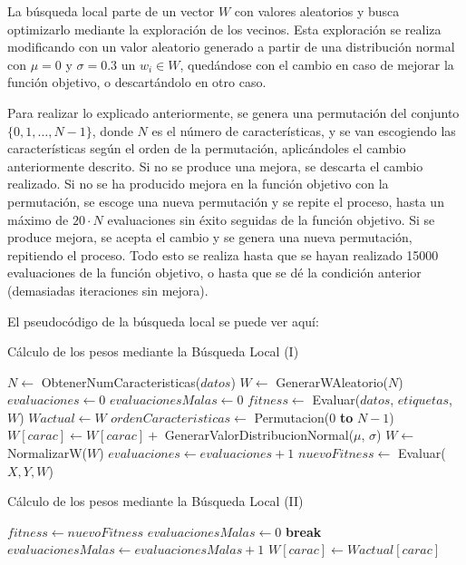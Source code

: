 \documentclass[11pt,a4paper]{article}
\begin{document}
La búsqueda local parte de un vector $W$ con valores aleatorios y busca optimizarlo mediante la exploración de los vecinos.
Esta exploración se realiza modificando con un valor aleatorio generado a partir de una distribución normal con $\mu = 0$ y 
$\sigma = 0.3$ un $w_i \in W$, quedándose con el cambio en caso de mejorar la función objetivo, o descartándolo en otro caso.

Para realizar lo explicado anteriormente, se genera una permutación del conjunto $\lbrace 0, 1, \dots , N-1 \rbrace$, donde $N$
es el número de características, y se van escogiendo las características según el orden de la permutación, aplicándoles
el cambio anteriormente descrito. Si no se produce una mejora, se descarta el cambio realizado. Si no se ha producido mejora
en la función objetivo con la permutación, se escoge una nueva permutación y se repite el proceso, hasta un máximo de $20
\cdot N$ evaluaciones sin éxito seguidas de la función objetivo. Si se produce mejora, se acepta el cambio y se genera una
nueva permutación, repitiendo el proceso. Todo esto se realiza hasta que se hayan realizado 15000 evaluaciones de la función
objetivo, o hasta que se dé la condición anterior (demasiadas iteraciones sin mejora).

El pseudocódigo de la búsqueda local se puede ver aquí:

\begin{algorithm}[H]
\label{alg:local-search}
\caption{Cálculo de los pesos mediante la Búsqueda Local (I)}
\begin{algorithmic}[1]
\State $N \gets $ ObtenerNumCaracteristicas($datos$)
\State $W \gets$ GenerarWAleatorio($N$)
\State $evaluaciones \gets 0$
\State $evaluacionesMalas \gets 0$
\State $fitness \gets$ Evaluar($datos$, $etiquetas$, $W$)
\State $Wactual \gets W$
\State $ordenCaracteristicas \gets $ Permutacion(0 \textbf{to} $N - 1$)
	\State $W[carac] \gets W[carac] + $ GenerarValorDistribucionNormal($\mu$, $\sigma$)	
	\State $W \gets$ NormalizarW($W$)
	\State $evaluaciones \gets evaluaciones + 1$
	\State $nuevoFitness \gets$ Evaluar($X, Y, W$)		
\end{algorithmic}
\end{algorithm}

\begin{algorithm}[H]
\caption{Cálculo de los pesos mediante la Búsqueda Local (II)}
\begin{algorithmic}
		\State $fitness \gets nuevoFitness$		
		\State $evaluacionesMalas \gets 0$		
		\State \textbf{break}
	\Else
		\State $evaluacionesMalas \gets evaluacionesMalas + 1$		
		\State $W[carac] \gets Wactual[carac]$		
	\EndIf	
		\State {}
	\EndIf
\EndFor
\EndWhile
\State {}
\EndFunction
\end{algorithmic}
\end{algorithm}
\end{document}
